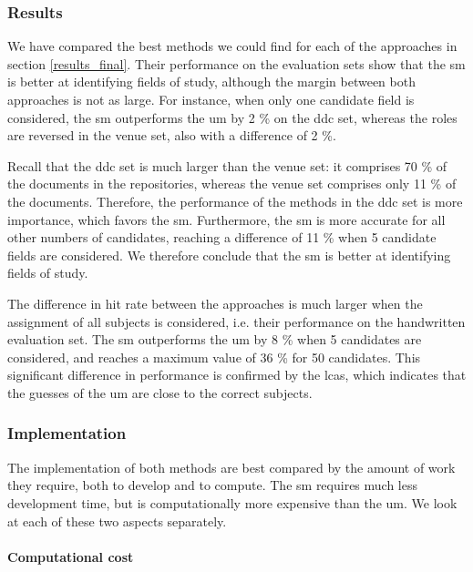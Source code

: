 \subsubsection{Results}

We have compared the best methods we could find for each of the approaches in section \ref{results_final}. Their performance on the evaluation sets show that the \acrshort{sm} is better at identifying fields of study, although the margin between both approaches is not as large. For instance, when only one candidate field is considered, the \acrshort{sm} outperforms the \acrshort{um} by 2 \% on the \acrshort{ddc} set, whereas the roles are reversed in the venue set, also with a difference of 2 \%.

Recall that the \acrshort{ddc} set is much larger than the venue set: it comprises 70 \% of the documents in the repositories, whereas the venue set comprises only 11 \% of the documents. Therefore, the performance of the methods in the \acrshort{ddc} set is more importance, which favors the \acrshort{sm}. Furthermore, the \acrshort{sm} is more accurate for all other numbers of candidates, reaching a difference of 11 \% when 5 candidate fields are considered. We therefore conclude that the \acrshort{sm} is better at identifying fields of study.

The difference in hit rate between the approaches is much larger when the assignment of all subjects is considered, i.e. their performance on the handwritten evaluation set. The \acrshort{sm} outperforms the \acrshort{um} by 8 \% when 5 candidates are considered, and reaches a maximum value of 36 \% for 50 candidates. This significant difference in performance is confirmed by the \acrfull{lcas}, which indicates that the guesses of the \acrshort{um} are close to the correct subjects.

\subsubsection{Implementation}

The implementation of both methods are best compared by the amount of work they require, both to develop and to compute. The \acrfull{sm} requires much less development time, but is computationally more expensive than the \acrfull{um}. We look at each of these two aspects separately.

\paragraph{Computational cost} \mbox{}

